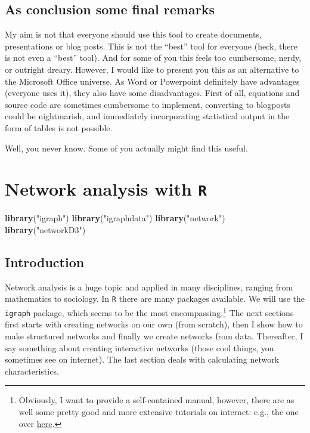\documentclass[]{article}
\newenvironment{Shaded}{\begin{snugshade}}{\end{snugshade}}
\newcommand{\KeywordTok}[1]{\textcolor[rgb]{0.13,0.29,0.53}{\textbf{#1}}}
\newcommand{\StringTok}[1]{\textcolor[rgb]{0.31,0.60,0.02}{#1}}
\newcommand{\NormalTok}[1]{#1}
\let\rmarkdownfootnote\footnote%
\def\footnote{\protect\rmarkdownfootnote}
\theoremstyle{definition}
\theoremstyle{definition}
\theoremstyle{definition}
\theoremstyle{remark}
\begin{document}
\subsection{As conclusion some final
remarks}\label{as-conclusion-some-final-remarks}

My aim is not that everyone should use this tool to create documents,
presentations or blog posts. This is not the ``best'' tool for everyone
(heck, there is not even a ``best'' tool). And for some of you this
feels too cumbersome, nerdy, or outright dreary. However, I would like
to present you this as an alternative to the Microsoft Office universe.
As Word or Powerpoint definitely have advantages (everyone uses it),
they also have some disadvantages. First of all, equations and source
code are sometimes cumbersome to implement, converting to blogposts
could be nightmarish, and immediately incorporating statistical output
in the form of tables is not possible.

Well, you never know. Some of you actually might find this useful.

\section{\texorpdfstring{Network analysis with
\texttt{R}}{Network analysis with R}}\label{network-analysis-with-r}

\begin{Shaded}
\begin{Highlighting}[]
\KeywordTok{library}\NormalTok{(}\StringTok{"igraph"}\NormalTok{)}
\KeywordTok{library}\NormalTok{(}\StringTok{"igraphdata"}\NormalTok{)}
\KeywordTok{library}\NormalTok{(}\StringTok{"network"}\NormalTok{)}
\KeywordTok{library}\NormalTok{(}\StringTok{"networkD3"}\NormalTok{)}
\end{Highlighting}
\end{Shaded}

\subsection{Introduction}\label{introduction-1}

Network analysis is a huge topic and applied in many disciplines,
ranging from mathematics to sociology. In \texttt{R} there are many
packages available. We will use the \texttt{igraph} package, which seems
to be the most encompassing.\footnote{Obviously, I want to provide a
  self-contained manual, however, there are as well some pretty good and
  more extensive tutorials on internet: e.g., the one over
  \href{http://kateto.net/networks-r-igraph/}{here}.} The next sections
first starts with creating networks on our own (from scratch), then I
show how to make structured networks and finally we create networks from
data. Thereafter, I say something about creating interactive networks
(those cool things, you sometimes see on internet). The last section
deals with calculating network characteristics.
\end{document}
